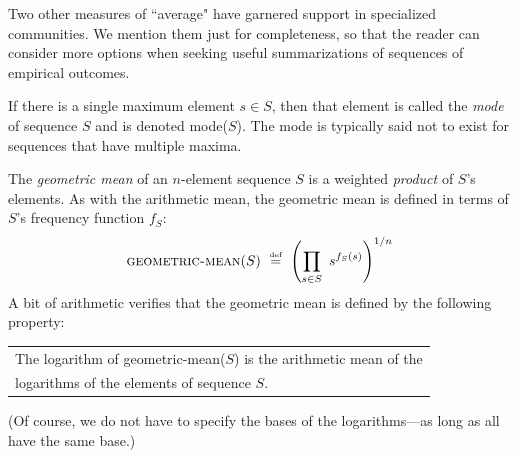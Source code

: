 \bigskip

\noindent {}
\bigskip

Two other measures of ``average" have garnered support in specialized communities.  We mention them just for completeness, so that the reader can consider more options when seeking useful summarizations of sequences of empirical outcomes.

\medskip

 

\noindent
If there is a single maximum element $s \in S$, then that element is called the {\em mode} of sequence $S$ and is denoted {\sc mode}($S$).  The mode is typically said not to exist for sequences that have multiple maxima.

\medskip

   

\noindent
The {\it geometric mean} of an $n$-element sequence $S$ is a weighted {\em product} of $S$'s elements.  As with the arithmetic mean, the geometric mean is defined in terms of $S$'s frequency function $f_S$:
\[ \mbox{\sc geometric-mean}(S) \ \stackrel{\mbox{{\tiny def}}}{=} \  \left(\prod_{s \in S} \ s^{f_S(s)} \right)^{1/n} \]
A bit of arithmetic verifies that the geometric mean is defined by the following property:

\smallskip

{\em 
\begin{tabular}{l}
The logarithm of {\sc geometric-mean}($S$) is the arithmetic mean of the \\
logarithms of the elements of sequence $S$.
\end{tabular}
}

\smallskip

\noindent
(Of course, we do not have to specify the bases of the logarithms---as long as all have the same base.)
 
